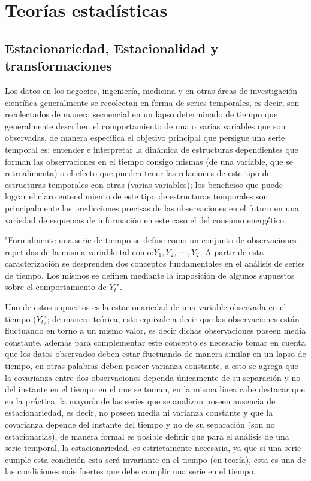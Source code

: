 \documentclass[12pt,letterpaper]{report}
\begin{document}
\section{Teorías estadísticas}

  \subsection{Estacionariedad, Estacionalidad y transformaciones}

Los datos en los negocios, ingeniería, medicina y en otras áreas de investigación científica generalmente se recolectan en forma de series temporales, es decir, son recolectados de manera secuencial en un lapso determinado de tiempo que generalmente describen el comportamiento de una o varias variables que son observadas, de manera específica el objetivo principal que persigue una serie temporal es: entender e interpretar la dinámica de estructuras dependientes que forman las observaciones en el tiempo consigo mismas (de una variable, que se retroalimenta) o el efecto que pueden tener las relaciones de este tipo de estructuras temporales con otras (varias variables); los beneficios que puede lograr el claro entendimiento de este tipo de estructuras temporales son principalmente las predicciones precisas de las observaciones en el futuro en una variedad de esquemas de información en este caso el del consumo energético.

"Formalmente una serie de tiempo se define como un conjunto de observaciones repetidas de la misma variable tal como:$ Y_1, Y_2, · · · , Y_T$. A partir de esta caracterización se desprenden dos conceptos fundamentales en el análisis de series de tiempo. Los mismos se definen mediante la imposición de algunos supuestos
sobre el comportamiento de $Y_t$". \cite{Isaac}

Uno de estos supuestos es la estacionariedad de una variable observada en el tiempo ($Y_t$); de manera teórica, esto equivale a decir que las observaciones están fluctuando en torno a un mismo valor, es decir dichas observaciones poseen media constante, además para complementar este concepto es necesario tomar en cuenta que los datos observados deben estar fluctuando de manera similar en un lapso de tiempo, en otras palabras deben poseer varianza constante, a esto se agrega que la covarianza entre dos observaciones dependa únicamente de su separación y no del instante en el tiempo en el que se toman, en la misma línea cabe destacar que en la práctica, la mayoría de las series que se analizan poseen ausencia de estacionariedad, es decir, no poseen media ni varianza constante y que la covarianza depende del instante del tiempo y no de su separación  (son no estacionarias), de manera formal es posible definir que para el análisis de una serie temporal, la estacionariedad, es estrictamente necesaria, ya que si una serie cumple esta condición esta será invariante en el tiempo (en teoría), esta es una de las condiciones más fuertes que debe cumplir una serie en el tiempo.
\end{document}
